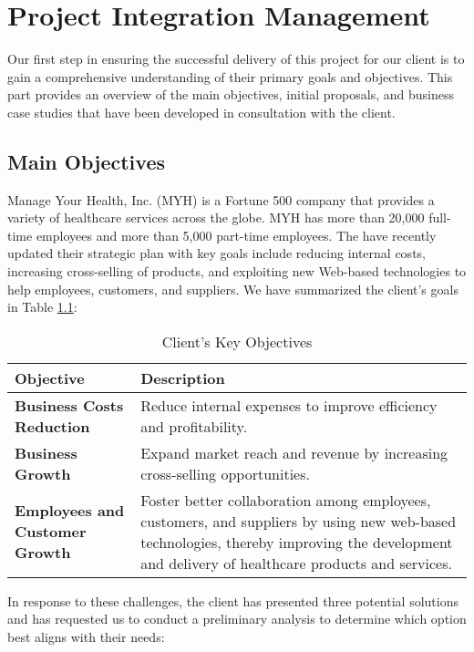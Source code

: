 \chapter{Project Integration Management}
Our first step in ensuring the successful delivery of this project for our client is to gain a comprehensive understanding of their primary goals and objectives. This part provides an overview of the main objectives, initial proposals, and business case studies that have been developed in consultation with the client.

\section{Main Objectives}

Manage Your Health, Inc. (MYH) is a Fortune 500 company that provides a variety of healthcare 
services across the globe. MYH has more than 20,000 full-time employees and more than 5,000 part-time 
employees. The have recently updated their strategic plan with key goals include reducing internal costs, increasing 
cross-selling of products, and exploiting new Web-based technologies to help employees, customers, and 
suppliers. We have summarized the client's goals in Table \ref{tab:objectives}:

\begin{table}[h]
\centering
\begin{tabular}{|>{\bfseries}l|p{9cm}|}
    \hline
    \textbf{Objective} & \textbf{Description} \\
    \hline
    Business Costs Reduction & Reduce internal expenses to improve efficiency and profitability. \\
    \hline
    Business Growth & Expand market reach and revenue by increasing cross-selling opportunities. \\
    \hline
    Employees and Customer Growth & Foster better collaboration among employees, customers, and suppliers by using new web-based technologies, thereby improving the development and delivery of healthcare products and services. \\
    \hline
\end{tabular}
\caption{Client's Key Objectives}
\label{tab:objectives}
\end{table}

In response to these challenges, the client has presented three potential solutions and has requested us to conduct a preliminary analysis to determine which option best aligns with their needs:

